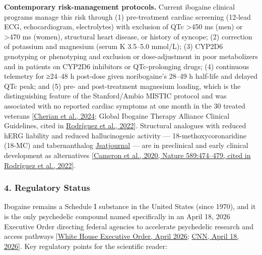\textbf{Contemporary risk-management protocols.} Current ibogaine clinical programs manage this risk through (1) pre-treatment cardiac screening (12-lead ECG, echocardiogram, electrolytes) with exclusion of QTc \textgreater450 ms (men) or \textgreater470 ms (women), structural heart disease, or history of syncope; (2) correction of potassium and magnesium (serum K 3.5--5.0 mmol/L); (3) CYP2D6 genotyping or phenotyping and exclusion or dose-adjustment in poor metabolizers and in patients on CYP2D6 inhibitors or QTc-prolonging drugs; (4) continuous telemetry for ≥24--48 h post-dose given noribogaine's 28--49 h half-life and delayed QTc peak; and (5) pre- and post-treatment magnesium loading, which is the distinguishing feature of the Stanford/Ambio MISTIC protocol and was associated with no reported cardiac symptoms at one month in the 30 treated veterans {[}\href{https://www.nature.com/articles/s41591-023-02705-w}{Cherian et al., 2024}; Global Ibogaine Therapy Alliance Clinical Guidelines, cited in \href{https://pubmed.ncbi.nlm.nih.gov/35012793/}{Rodríguez et al., 2022}{]}. Structural analogues with reduced hERG liability and reduced hallucinogenic activity --- 18-methoxycoronaridine (18-MC) and tabernanthalog \href{https://www.jsatjournal.com/article/S0740-5472(21)00443-8/fulltext}{Jsatjournal} --- are in preclinical and early clinical development as alternatives {[}\href{https://pubmed.ncbi.nlm.nih.gov/35012793/}{Cameron et al., 2020, Nature 589:474--479, cited in Rodríguez et al., 2022}{]}.

\subsubsection{4. Regulatory Status}\label{20_ibogaine-regulatory-status}

Ibogaine remains a Schedule I substance in the United States (since 1970), and it is the only psychedelic compound named specifically in an April 18, 2026 Executive Order directing federal agencies to accelerate psychedelic research and access pathways {[}\href{https://www.whitehouse.gov/presidential-actions/2026/04/accelerating-medical-treatments-for-serious-mental-illness/}{White House Executive Order, April 2026}; \href{https://www.cnn.com/2026/04/18/politics/trump-signs-executive-order-urging-more-research-into-psychedelic-ibogaine}{CNN, April 18, 2026}{]}. Key regulatory points for the scientific reader:

